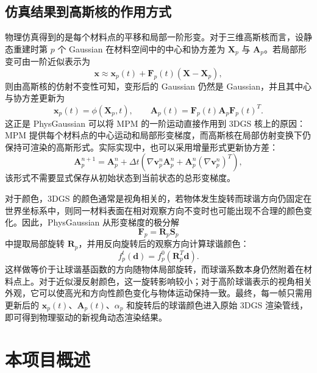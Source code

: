 \documentclass[a4paper]{article}
\begin{document}
\subsection{仿真结果到高斯核的作用方式}

物理仿真得到的是每个材料点的平移和局部一阶形变。对于三维高斯核而言，设静态重建时第 $p$ 个 Gaussian 在材料空间中的中心和协方差为 $\bm{X}_p$ 与 $\bm{A}_p$。若局部形变可由一阶近似表示为
\[
    \bm{x}
    \approx
    \bm{x}_p(t)
    +
    \bm{F}_p(t)(\bm{X}-\bm{X}_p),
\]
则由高斯核的仿射不变性可知，变形后的 Gaussian 仍然是 Gaussian，并且其中心与协方差更新为
\[
    \bm{x}_p(t)=\phi(\bm{X}_p,t),
    \qquad
    \bm{A}_p(t)
    =
    \bm{F}_p(t)\bm{A}_p\bm{F}_p(t)^{T}.
\]
这正是 PhysGaussian 可以将 MPM 的一阶运动直接作用到 3DGS 核上的原因：MPM 提供每个材料点的中心运动和局部形变梯度，而高斯核在局部仿射变换下仍保持可渲染的高斯形式。实际实现中，也可以采用增量形式更新协方差：
\[
    \bm{A}_p^{n+1}
    =
    \bm{A}_p^n
    +
    \Delta t
    \left(
        \nabla \bm{v}_p^n \bm{A}_p^n
        +
        \bm{A}_p^n(\nabla \bm{v}_p^n)^{T}
    \right),
\]
该形式不需要显式保存从初始状态到当前状态的总形变梯度。

对于颜色，3DGS 的颜色通常是视角相关的，若物体发生旋转而球谐方向仍固定在世界坐标系中，则同一材料表面在相对观察方向不变时也可能出现不合理的颜色变化。因此，PhysGaussian 从形变梯度的极分解
\[
    \bm{F}_p = \bm{R}_p\bm{S}_p
\]
中提取局部旋转 $\bm{R}_p$，并用反向旋转后的观察方向计算球谐颜色：
\[
    f_p^t(\bm{d})
    =
    f_p^0(\bm{R}_p^{T}\bm{d}).
\]
这样做等价于让球谐基函数的方向随物体局部旋转，而球谐系数本身仍然附着在材料点上。对于近似漫反射颜色，这一旋转影响较小；对于高阶球谐表示的视角相关外观，它可以使高光和方向性颜色变化与物体运动保持一致。最终，每一帧只需用更新后的 $\bm{x}_p(t)$、$\bm{A}_p(t)$、$\alpha_p$ 和旋转后的球谐颜色进入原始 3DGS 渲染管线，即可得到物理驱动的新视角动态渲染结果。

\section{本项目概述}
\end{document}
